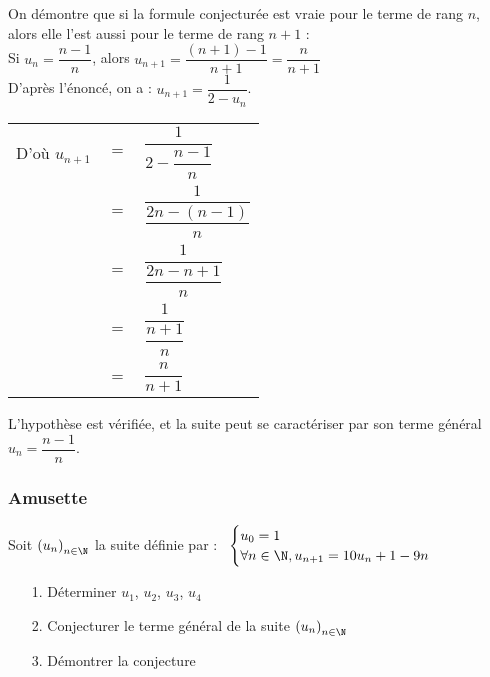 On démontre que si la formule conjecturée est vraie pour le terme de rang $n$, alors elle l'est aussi pour le terme de rang $n + 1$ : \\

Si $u_n = \dfrac{n-1}{n}$, alors $ u_{n+1} = \dfrac{\left(n+1\right) - 1}{n + 1} = \dfrac{n}{n+1}$ \\

D'après l'énoncé, on a : $u_{n+1} = \dfrac{1}{2 - u_n}$. \\


\begin{tabular}{lll}
D'où $u_{n+1}$ & $ = $ & $ \dfrac{1}{2 - \dfrac{n-1}{n}}$ \vspace*{.3cm}  \\
& $ = $ & $\dfrac{1}{\dfrac{2n - \left(n-1\right)}{n}}$ \vspace*{.3cm} \\
& $=$ & $\dfrac{1}{\dfrac{2n - n + 1}{n}}$ \vspace*{.3cm} \\
& $=$ & $\dfrac{1}{\dfrac{n+1}{n}}$ \vspace*{.3cm} \\
& $=$ & $\dfrac{n}{n+1}$ \vspace*{.3cm} \\
\end{tabular}

\vspace*{.3cm}

L'hypothèse est vérifiée, et la suite peut se caractériser par son terme général $u_n = \dfrac{n-1}{n}$.

\newpage
 
\subsubsection{Amusette}

Soit $\left(u_n\right)_{n \in \N}$ la suite définie par :$ \; \; \; \begin{cases}
u_0 = 1 \\
\forall n \in \N, u_{n+1} = 10u_n + 1 - 9n \\
\end{cases}$ \\

\begin{itemize}
\item[1.] Déterminer $u_1$, $u_2$, $u_3$, $u_4$ \\
\item[2.] Conjecturer le terme général de la suite $\left(u_n\right)_{n \in \N}$ \\
\item[3.] Démontrer la conjecture \\
\end{itemize}

